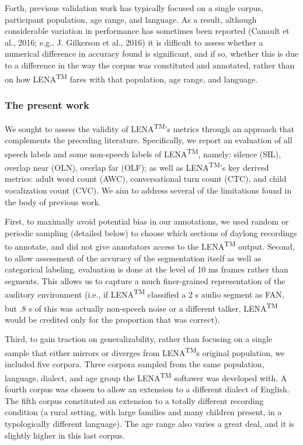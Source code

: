 \documentclass[english,floatsintext,man]{apa6}
\begin{document}
Forth, previous validation work has typically focused on a single
corpus, participant population, age range, and language. As a result,
although considerable variation in performance has sometimes been
reported (Canault et al., 2016; e.g., J. Gilkerson et al., 2016) it is
difficult to assess whether a numerical difference in accuracy found is
significant, and if so, whether this is due to a difference in the way
the corpus was constituted and annotated, rather than on how
LENA\textsuperscript{TM} fares with that population, age range, and
language.

\subsubsection{The present work}\label{the-present-work}

We sought to assess the validity of LENA\textsuperscript{TM}'s metrics
through an approach that complements the preceding literature.
Specifically, we report an evaluation of all speech labels and some
non-speech labels of LENA\textsuperscript{TM}, namely: silence (SIL),
overlap near (OLN), overlap far (OLF); as well as
LENA\textsuperscript{TM}'s key derived metrics: adult word count (AWC),
conversational turn count (CTC), and child vocalization count (CVC). We
aim to address several of the limitations found in the body of previous
work.

First, to maximally avoid potential bias in our annotations, we used
random or periodic sampling (detailed below) to choose which sections of
daylong recordings to annotate, and did not give annotators access to
the LENA\textsuperscript{TM} output. Second, to allow assessment of the
accuracy of the segmentation itself as well as categorical labeling,
evaluation is done at the level of 10 ms frames rather than segments.
This allows us to capture a much finer-grained representation of the
auditory environment (i.e., if LENA\textsuperscript{TM} classified a 2 s
audio segment as FAN, but .8 s of this was actually non-speech noise or
a different talker, LENA\textsuperscript{TM} would be credited only for
the proportion that was correct).

Third, to gain traction on generalizability, rather than focusing on a
single sample that either mirrors or diverges from
LENA\textsuperscript{TM}s original population, we included five corpora.
Three corpora sampled from the same population, language, dialect, and
age group the LENA\textsuperscript{TM} softawer was developed with. A
fourth corpus was chosen to allow an extension to a different dialect of
English. The fifth corpus constituted an extension to a totally
different recording condition (a rural setting, with large families and
many children present, in a typologically different language). The age
range also varies a great deal, and it is slightly higher in this last
corpus.
\end{document}
